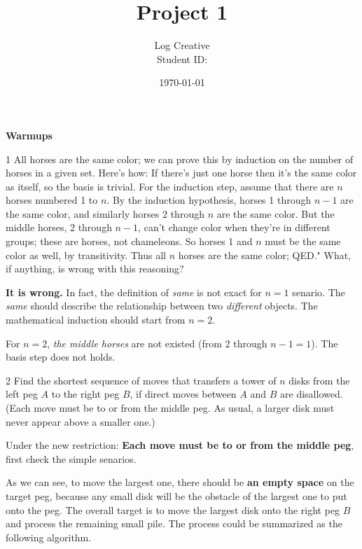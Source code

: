 \documentclass[a4paper,12pt]{article}
\title{Project 1}
\author{Log Creative\\\small Student ID: }
\date{\today}
\makeatletter
\newtheorem*{solution}{Solution}
\theoremstyle{definition}
\renewenvironment{solution}[1][Solution] {\par\pushQED{\qed}\normalfont\topsep6\p@\@plus6\p@\relax\trivlist\item[\hskip\labelsep\bfseries#1\@addpunct{.}]\ignorespaces}{\popQED\endtrivlist\@endpefalse} \makeatother
\newenvironment{problems}{\begin{list}{}{\renewcommand{\makelabel}[1]{\textbf{##1}\hfil}}}{\end{list}}
\makeatother
\begin{document}
\maketitle

\noindent\textbf{Warmups}

\begin{problems}
    \item[1] All horses are the same color; we can prove this by induction on the number of horses in a given set. Here's how: If there's just one horse then it's the same color as itself, so the basis is trivial. 
    For the induction step, assume that there are $n$ horses numbered 1 to $n$. By the induction hypothesis, horses 1 through $n - 1$ are the same color, and similarly horses 2 through $n$ are the same color. 
    But the middle horses, 2 through $n - 1$, can't change color when they're in different groups; these are horses, not chameleons. 
    So horses 1 and $n$ must be the same color as well, by transitivity. Thus all $n$ horses are the same color; QED." What, if anything, is wrong with this reasoning?
    \begin{solution}
        \textbf{It is wrong.} In fact, the definition of \emph{same} is not exact for $n=1$ senario. The \emph{same} should describe the relationship between two \emph{different} objects. The mathematical induction should start from $n=2$.

        For $n=2$, \emph{the middle horses} are not existed (from 2 through $n-1=1$). The basis step does not holds.
    \end{solution}

    \item[2] Find  the  shortest  sequence  of  moves  that  transfers  a  tower  of $n$ disks from the left peg $A$ to the right peg $B$, if direct moves between $A$ and $B$ are disallowed. (Each move must be to or from the middle peg. As usual, a larger disk must never appear above a smaller one.)

    \begin{solution}
        Under the new restriction: \textbf{Each move must be to or from the middle peg}, first check the simple senarios.

        

        As we can see, to move the largest one, there should be \textbf{an empty space} on the target peg, because any small disk will be the obstacle of the largest one to put onto the peg. The overall target is to move the largest disk onto the right peg $B$ and process the remaining small pile. The process could be summarized as the following algorithm.


\end{solution}
\end{problems}
\end{document}
